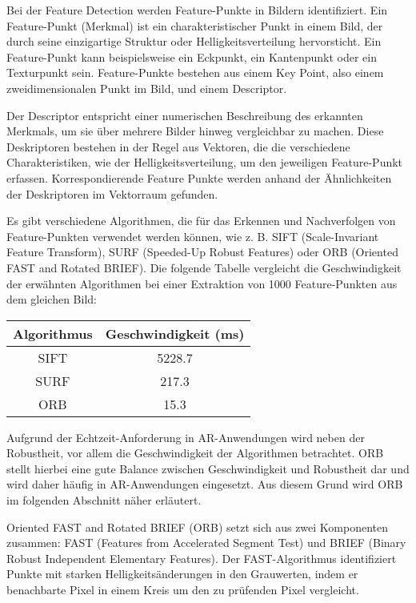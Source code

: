Bei der Feature Detection werden Feature-Punkte in Bildern identifiziert. Ein Feature-Punkt (Merkmal) ist ein charakteristischer Punkt in einem Bild, der durch seine einzigartige Struktur oder Helligkeitsverteilung hervorsticht. Ein Feature-Punkt kann beispielsweise ein Eckpunkt, ein Kantenpunkt oder ein Texturpunkt sein. Feature-Punkte bestehen aus einem Key Point, also einem zweidimensionalen Punkt im Bild, und einem Descriptor. 

Der Descriptor entspricht einer numerischen Beschreibung des erkannten Merkmals, um sie über mehrere Bilder hinweg vergleichbar zu machen. Diese Deskriptoren bestehen in der Regel aus Vektoren, die die verschiedene Charakteristiken, wie der Helligkeitsverteilung, um den jeweiligen Feature-Punkt erfassen. Korrespondierende Feature Punkte werden anhand der Ähnlichkeiten der Deskriptoren im Vektorraum gefunden.

Es gibt verschiedene Algorithmen, die für das Erkennen und Nachverfolgen von Feature-Punkten verwendet werden können, wie z. B. SIFT (Scale-Invariant Feature Transform), SURF (Speeded-Up Robust Features) oder ORB (Oriented FAST and Rotated BRIEF). Die folgende Tabelle vergleicht die Geschwindigkeit der erwähnten Algorithmen bei einer Extraktion von 1000 Feature-Punkten aus dem gleichen Bild:

\begin{center}
    \begin{tabular}{ |c|c| } 
        \hline
        Algorithmus & Geschwindigkeit (ms) \\
        \hline
        SIFT & 5228.7 \\
        SURF & 217.3 \\
        ORB & 15.3 \\
        \hline
    \end{tabular}
\end{center}

Aufgrund der Echtzeit-Anforderung in AR-Anwendungen wird neben der Robustheit, vor allem die Geschwindigkeit der Algorithmen betrachtet. ORB stellt hierbei eine gute Balance zwischen Geschwindigkeit und Robustheit dar und wird daher häufig in AR-Anwendungen eingesetzt. Aus diesem Grund wird ORB im folgenden Abschnitt näher erläutert.

Oriented FAST and Rotated BRIEF (ORB) setzt sich aus zwei Komponenten zusammen: FAST (Features from Accelerated Segment Test) und BRIEF (Binary Robust Independent Elementary Features). Der FAST-Algorithmus identifiziert Punkte mit starken Helligkeitsänderungen in den Grauwerten, indem er benachbarte Pixel in einem Kreis um den zu prüfenden Pixel vergleicht. 

